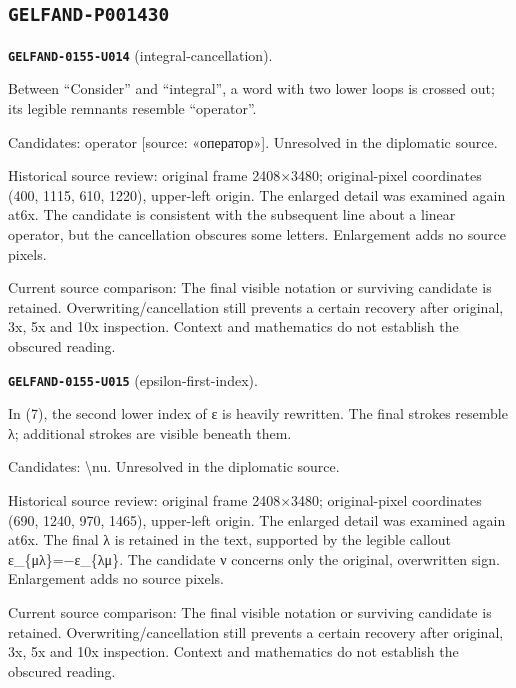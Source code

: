 \subsection*{\texttt{GELFAND-P001430}}
\par\noindent\leavevmode{}\label{GELFAND-0155-U014}\label{GELFAND-P001430:integral-cancellation}\textbf{\texttt{GELFAND-0155-U014}} (integral-cancellation).\nopagebreak[4]\par
Between “Consider” and “integral”, a word with two lower loops is crossed out; its legible remnants resemble “operator”.\par
Candidates: operator [source: «оператор»]. Unresolved in the diplomatic source.\par
Historical source review: original frame 2408×3480; original-pixel coordinates (400, 1115, 610, 1220), upper-left origin. The enlarged detail was examined again at6x. The candidate is consistent with the subsequent line about a linear operator, but the cancellation obscures some letters. Enlargement adds no source pixels.\par
Current source comparison: The final visible notation or surviving candidate is retained. Overwriting/cancellation still prevents a certain recovery after original, 3x, 5x and 10x inspection. Context and mathematics do not establish the obscured reading.\par
\medskip
\par\noindent\leavevmode{}\label{GELFAND-0155-U015}\label{GELFAND-P001430:epsilon-first-index}\textbf{\texttt{GELFAND-0155-U015}} (epsilon-first-index).\nopagebreak[4]\par
In (7), the second lower index of ε is heavily rewritten. The final strokes resemble λ; additional strokes are visible beneath them.\par
Candidates: \textbackslash{}nu. Unresolved in the diplomatic source.\par
Historical source review: original frame 2408×3480; original-pixel coordinates (690, 1240, 970, 1465), upper-left origin. The enlarged detail was examined again at6x. The final λ is retained in the text, supported by the legible callout ε\_\{μλ\}=−ε\_\{λμ\}. The candidate ν concerns only the original, overwritten sign. Enlargement adds no source pixels.\par
Current source comparison: The final visible notation or surviving candidate is retained. Overwriting/cancellation still prevents a certain recovery after original, 3x, 5x and 10x inspection. Context and mathematics do not establish the obscured reading.\par
